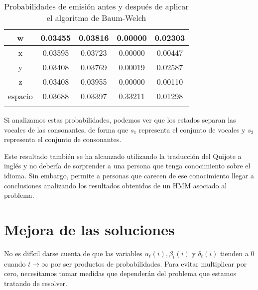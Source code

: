 \begin{exampleth}
\begin{longtable}{|c|C|C|C|C|}
        \hline
        w & 0.03455 & 0.03816 & 0.00000 & 0.02303\\
        \hline
        x & 0.03595 & 0.03723 & 0.00000 & 0.00447\\
        \hline
        y & 0.03408 & 0.03769 & 0.00019 & 0.02587\\
        \hline
        z & 0.03408 & 0.03955 & 0.00000 & 0.00110\\
        \hline
        espacio &  0.03688 & 0.03397 & 0.33211 &  0.01298\\
        \hline
        \caption{Probabilidades de emisión antes y después de aplicar el algoritmo de Baum-Welch \cite{Stamp}}
\end{longtable}
Si analizamos estas probabilidades, podemos ver que los estados separan las vocales de las consonantes, de forma que $s_1$ representa el conjunto de vocales y $s_2$ representa el conjunto de consonantes.

Este resultado también se ha alcanzado utilizando la traducción del Quijote a inglés \cite{AnálisisVoynich} y no debería de sorprender a una persona que tenga conocimiento sobre el idioma. Sin embargo, permite a personas que carecen de ese conocimiento llegar a conclusiones analizando los resultados obtenidos de un HMM asociado al problema.
\end{exampleth}

\section{Mejora de las soluciones}
No es difícil darse cuenta de que las variables $\alpha_t(i), \beta_t(i)$ y $\delta_t(i)$ tienden a $0$ cuando $t\rightarrow\infty$ por ser productos de probabilidades. Para evitar multiplicar por cero, necesitamos tomar medidas que dependerán del problema que estamos tratando de resolver.
